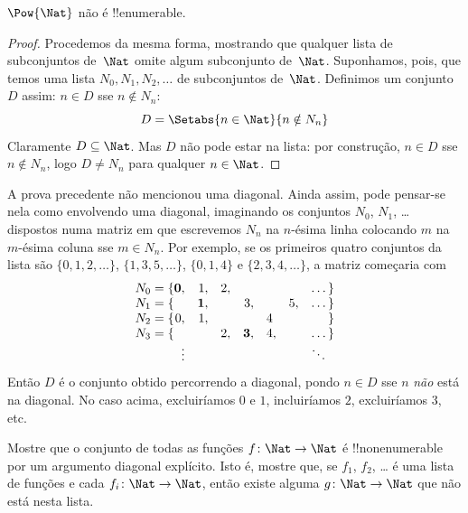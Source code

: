 \documentclass[../../../include/open-logic-section]{subfiles}
\begin{document}
\begin{thm}
$\Pow{\Nat}$ não é !!{enumerable}.
\end{thm}

\begin{proof}
Procedemos da mesma forma, mostrando que qualquer lista de subconjuntos
de~$\Nat$ omite algum subconjunto de~$\Nat$. Suponhamos, pois, que temos uma
lista $N_0, N_1, N_2, \ldots$ de subconjuntos de~$\Nat$. Definimos um conjunto $D$
assim: $n \in D$ sse $n \notin N_{n}$:
\[
D = \Setabs{n \in \Nat}{n \notin N_n}
\]
Claramente $D\subseteq \Nat$. Mas $D$ não pode estar na lista: por construção,
$n \in D$ sse $n\notin N_n$, logo $D \neq N_n$ para qualquer $n \in \Nat$.
\end{proof}

\begin{explain}
A prova precedente não mencionou uma diagonal. Ainda assim, pode pensar-se nela
como envolvendo uma diagonal, imaginando os conjuntos $N_0$, $N_1$, \dots{}
dispostos numa matriz em que escrevemos $N_n$ na $n$-ésima linha colocando $m$ na
$m$-ésima coluna sse $m \in N_n$. Por exemplo, se os primeiros quatro conjuntos da
lista são $\{0,1,2,\dots\}$, $\{1, 3, 5, \dots\}$, $\{0,1,4\}$ e
$\{2,3,4,\dots\}$, a matriz começaria com
\[
\begin{array}{r@{}rrrrrrr}
  N_0 = \{ & \mathbf{0}, & 1, & 2, & & & & \dots\}\\
  N_1 = \{ &  & \mathbf{1}, &  & 3, &  & 5, & \dots\}\\
  N_2 = \{ & 0, & 1, &  &  & 4\phantom{,} &  & \}\\
  N_3 = \{ &  &  & 2, & \mathbf{3}, & 4, & & \dots\}\\
  &\vdots & & & & & & \ddots\phantom{\}}
  \end{array}
\]
Então $D$ é o conjunto obtido percorrendo a diagonal, pondo $n \in D$ sse $n$
\emph{não} está na diagonal. No caso acima, excluiríamos $0$ e $1$, incluiríamos
$2$, excluiríamos $3$, etc.
\end{explain}

\begin{prob}
Mostre que o conjunto de todas as funções $f \colon \Nat \to \Nat$ é
!!{nonenumerable} por um argumento diagonal explícito. Isto é, mostre que, se
$f_1$, $f_2$, \dots{} é uma lista de funções e cada $f_i\colon \Nat \to \Nat$,
então existe alguma $g \colon \Nat \to \Nat$ que não está nesta lista.
\end{prob}
\end{document}
